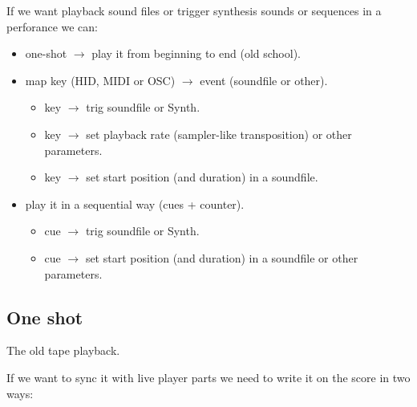 If we want playback sound files or trigger synthesis sounds or sequences in a perforance we can:

\begin{itemize}
\tightlist
\item one-shot \(\rightarrow\) play it from beginning to end (old school).
\item map key (HID, MIDI or OSC) \(\rightarrow\) event (soundfile or other).
     \begin{itemize}
     \tightlist
     \item key \(\rightarrow\) trig soundfile or Synth.
     \item key \(\rightarrow\) set playback rate (sampler-like transposition) or other parameters.
     \item key \(\rightarrow\) set start position (and duration) in a soundfile.
     \end{itemize}
\item play it in a sequential way (cues + counter).
     \begin{itemize}
     \tightlist
     \item cue \(\rightarrow\) trig soundfile or Synth.
     \item cue \(\rightarrow\) set start position (and duration) in a soundfile or other parameters.
     \end{itemize}
\end{itemize}

\subsection{One shot}\label{one-shot}

The old tape playback.

If we want to sync it with live player parts we need to write it on the score in two ways:

